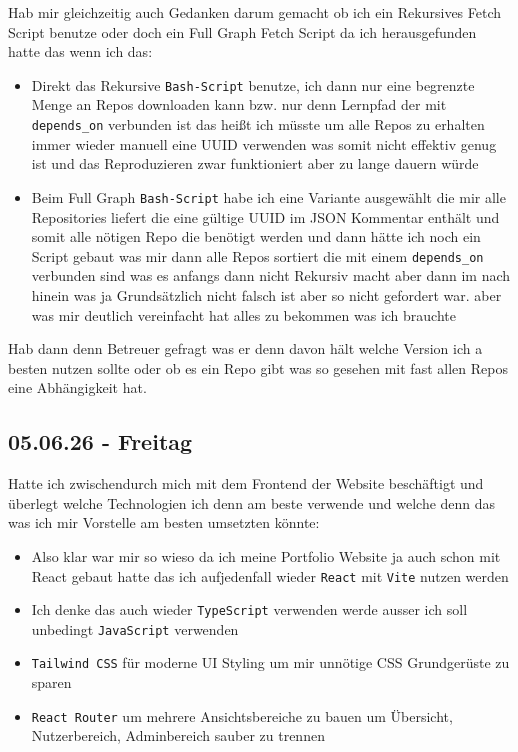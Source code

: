 {Hab mir gleichzeitig auch Gedanken darum gemacht ob ich ein Rekursives Fetch Script benutze oder doch ein Full Graph Fetch Script da ich herausgefunden hatte das wenn ich das:

\begin{itemize}[topsep=0pt,itemsep=0pt,parsep=0pt,leftmargin=1.5em]
  \item Direkt das Rekursive \texttt{Bash-Script} benutze, ich dann nur eine begrenzte Menge an Repos downloaden kann bzw. nur denn Lernpfad der mit \texttt{depends\_on} verbunden ist das heißt ich müsste um alle Repos zu erhalten immer wieder manuell eine UUID verwenden was somit nicht effektiv genug ist und das Reproduzieren zwar funktioniert aber zu lange dauern würde
  \item Beim Full Graph \texttt{Bash-Script} habe ich eine Variante ausgewählt die mir alle Repositories liefert die eine gültige UUID im JSON Kommentar enthält und somit alle nötigen Repo die benötigt werden und dann hätte ich noch ein Script gebaut was mir dann alle Repos sortiert die mit einem \texttt{depends\_on} verbunden sind was es anfangs dann nicht Rekursiv macht aber dann im nach hinein was ja Grundsätzlich nicht falsch ist aber so nicht gefordert war. aber was mir deutlich vereinfacht hat alles zu bekommen was ich brauchte
\end{itemize}

Hab dann denn Betreuer gefragt was er denn davon hält welche Version ich a besten nutzen sollte oder ob es ein Repo gibt was so gesehen mit fast allen Repos eine Abhängigkeit hat.

\subsection{05.06.26 - Freitag}

Hatte ich zwischendurch mich mit dem Frontend der Website beschäftigt und überlegt welche Technologien ich denn am beste verwende und welche denn das was ich mir Vorstelle am besten umsetzten könnte:

\begin{itemize}
  \item Also klar war mir so wieso da ich meine Portfolio Website ja auch schon mit React gebaut hatte das ich aufjedenfall wieder \texttt{React} mit \texttt{Vite} nutzen werden
  \item Ich denke das auch wieder \texttt{TypeScript} verwenden werde ausser ich soll unbedingt \texttt{JavaScript} verwenden
  \item \texttt{Tailwind CSS} für moderne UI Styling um mir unnötige CSS Grundgerüste zu sparen
  \item \texttt{React Router} um mehrere Ansichtsbereiche zu bauen um Übersicht, Nutzerbereich, Adminbereich sauber zu trennen
\end{itemize}
}

